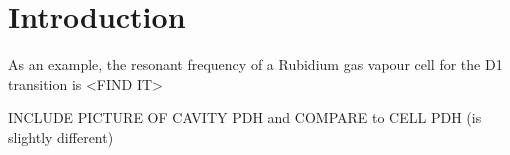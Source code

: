 \newpage
\section{Introduction}




As an example, the resonant frequency of a Rubidium gas vapour cell for the D1 transition is <FIND IT>

INCLUDE PICTURE OF CAVITY PDH and COMPARE to CELL PDH (is slightly different)